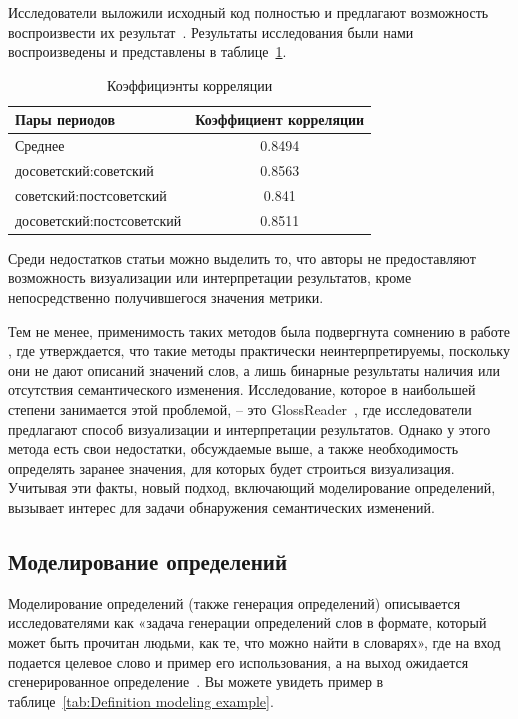 \documentclass[LI,VKR]{HSEUniversity}
\begin{document}
Исследователи выложили исходный код полностью и предлагают возможность воспроизвести их
результат~.
Результаты исследования были нами воспроизведены и представлены в таблице~\ref{tab:DeepMistake}.

\begin{table}[H]
\centering
\caption{Коэффициэнты корреляции}
\label{tab:DeepMistake}
\begin{tabular}{|l|c|}
\hline
Пары периодов                  & Коэффициент корреляции \\
\hline
Среднее            & 0.8494                  \\
\hline
досоветский:советский           & 0.8563                  \\
\hline
советский:постсоветский          & 0.841                  \\
\hline
досоветский:постсоветский      & 0.8511                  \\
\hline
\end{tabular}
\end{table}

Среди недостатков статьи можно выделить то, что авторы не предоставляют возможность визуализации
или интерпретации результатов, кроме непосредственно получившегося значения метрики.

Тем не менее, применимость таких методов была подвергнута сомнению в работе
\cite{DefinitionGenerationMainArticle},
где
утверждается, что такие методы практически неинтерпретируемы,
поскольку они не дают описаний значений слов,
а лишь бинарные результаты наличия или отсутствия семантического изменения.
Исследование, которое в наибольшей степени занимается этой проблемой, – это GlossReader~\cite{GlossReader},
где исследователи предлагают способ визуализации и интерпретации результатов.
Однако у этого метода есть свои недостатки, обсуждаемые выше, а также
необходимость определять заранее значения, для которых будет строиться визуализация.
Учитывая эти факты, новый подход, включающий моделирование определений,
вызывает интерес для задачи обнаружения семантических изменений.

\subsection{Моделирование определений}

Моделирование определений (также генерация определений) описывается исследователями как
«задача генерации определений слов в формате,
который может быть прочитан людьми, как те, что можно найти в словарях»,
где на вход подается целевое слово и пример его использования, а на выход
ожидается сгенерированное определение~\cite{DefinitionGenerationMainArticle}.
Вы можете увидеть пример в таблице~\ref{tab:Definition modeling example}.
\end{document}
